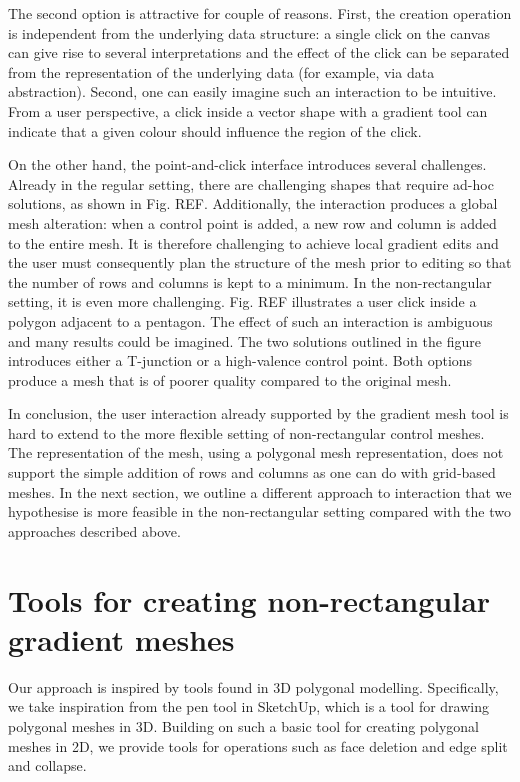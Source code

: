 \documentclass{egpubl}
\begin{document}
The second option is attractive for couple of reasons. First, the creation operation is independent from the underlying data structure: a single click on the canvas can give rise to several interpretations and the effect of the click can be separated from the representation of the underlying data (for example, via data abstraction). Second, one can easily imagine such an interaction to be intuitive. From a user perspective, a click inside a vector shape with a gradient tool can indicate that a given colour should influence the region of the click.

On the other hand, the point-and-click interface introduces several challenges. Already in the regular setting, there are challenging shapes that require ad-hoc solutions, as shown in Fig. REF. Additionally, the interaction produces a global mesh alteration: when a control point is added, a new row and column is added to the entire mesh. It is therefore challenging to achieve local gradient edits and the user must consequently plan the structure of the mesh prior to editing so that the number of rows and columns is kept to a minimum. In the non-rectangular setting, it is even more challenging. Fig. REF illustrates a user click inside a polygon adjacent to a pentagon. The effect of such an interaction is ambiguous and many results could be imagined. The two solutions outlined in the figure introduces either a T-junction or a high-valence control point. Both options produce a mesh that is of poorer quality compared to the original mesh.

In conclusion, the user interaction already supported by the gradient mesh tool is hard to extend to the more flexible setting of non-rectangular control meshes. The representation of the mesh, using a polygonal mesh representation, does not support the simple addition of rows and columns as one can do with grid-based meshes. In the next section, we outline a different approach to interaction that we hypothesise is more feasible in the non-rectangular setting compared with the two approaches described above.

\section{Tools for creating non-rectangular gradient meshes}
\label{sec:method}

Our approach is inspired by tools found in 3D polygonal modelling. Specifically, we take inspiration from the pen tool in SketchUp, which is a tool for drawing polygonal meshes in 3D. Building on such a basic tool for creating polygonal meshes in 2D, we provide tools for operations such as face deletion and edge split and collapse.
\end{document}
